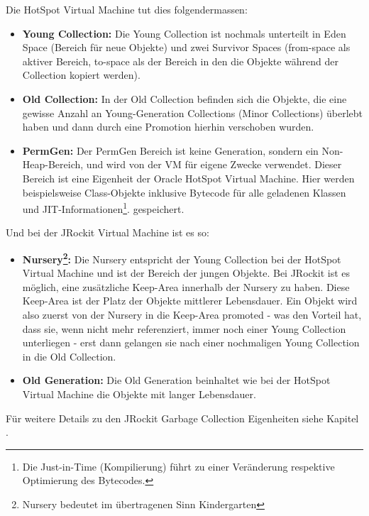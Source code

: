 Die HotSpot Virtual Machine tut dies folgendermassen\cite{langerkreft201003}:

\begin{itemize}
	\item \textbf{Young Collection:} Die Young Collection ist nochmals unterteilt in Eden Space (Bereich für neue Objekte) und zwei Survivor Spaces (from-space als aktiver Bereich, to-space als der Bereich in den die Objekte während der Collection kopiert werden).
	\item \textbf{Old Collection:} In der Old Collection befinden sich die Objekte, die eine gewisse Anzahl an Young-Generation Collections (Minor Collections) überlebt haben und dann durch eine Promotion hierhin verschoben wurden.
	\item  \textbf{PermGen:} Der PermGen Bereich ist keine Generation, sondern ein Non-Heap-Bereich, und wird von der VM für eigene Zwecke verwendet. Dieser Bereich ist eine Eigenheit der Oracle HotSpot Virtual Machine. Hier werden beispielsweise Class-Objekte inklusive Bytecode für alle geladenen Klassen und JIT-Informationen\footnote{Die Just-in-Time (Kompilierung) führt zu einer Veränderung respektive Optimierung des Bytecodes.}. gespeichert.
\end{itemize}

Und bei der JRockit Virtual Machine ist es so:
\begin{itemize}
	\item \textbf{Nursery\footnote{Nursery bedeutet im übertragenen Sinn Kindergarten}:} Die Nursery entspricht der Young Collection bei der HotSpot Virtual Machine und ist der Bereich der jungen Objekte. Bei JRockit ist es möglich, eine zusätzliche Keep-Area innerhalb der Nursery zu haben. Diese Keep-Area ist der Platz der Objekte mittlerer Lebensdauer. Ein Objekt wird also zuerst von der Nursery in die Keep-Area promoted - was den Vorteil hat, dass sie, wenn nicht mehr referenziert, immer noch einer Young Collection unterliegen - erst dann gelangen sie nach einer nochmaligen Young Collection in die Old Collection.
	\item \textbf{Old Generation: } Die Old Generation beinhaltet wie bei der HotSpot Virtual Machine die Objekte mit langer Lebensdauer.
\end{itemize}
Für weitere Details zu den JRockit Garbage Collection Eigenheiten siehe Kapitel .


